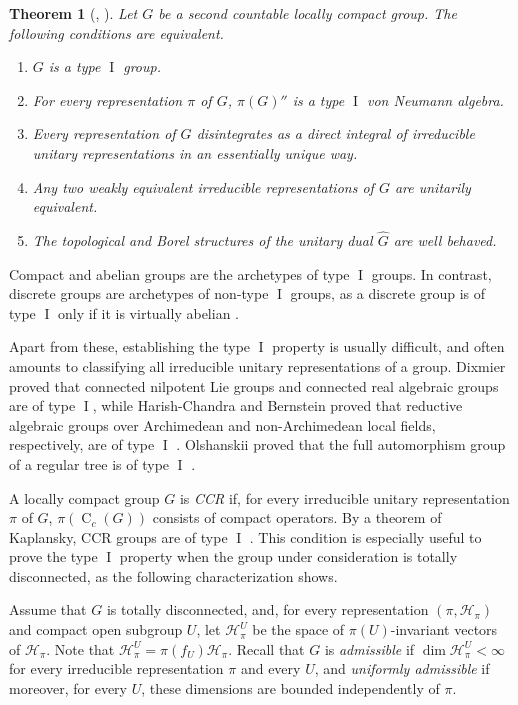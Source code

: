 \documentclass[11pt]{amsart}
\numberwithin{equation}{section}
\renewcommand{\H}{\mathcal H}
\DeclareMathOperator{\I}{I}
\newcommand{\rC}{\operatorname{C}}
\newtheorem{The}{Theorem}[section]
\theoremstyle{definition}
\begin{document}
\begin{The}[{\cite{Gl61}, \cite[Theorem~8.F.3]{BH20}}]
    \label{thm:glimm}
    Let $G$ be a second countable locally compact group. The following conditions are equivalent.
    \begin{enumerate}[\rm (i)]
        \item $G$ is a type $\I$ group.
        \item\label{it:glimm-vna} For every representation $\pi$ of $G$, $\pi(G)''$ is a type $\I$ von Neumann algebra.
        \item\label{it:glimm-disintegration} Every representation of $G$ disintegrates as a direct integral of irreducible unitary representations in an essentially unique way.
        \item\label{it:glimm-weak} Any two weakly equivalent irreducible representations of $G$ are unitarily equivalent.
        \item\label{it:glimm-dual} The topological and Borel structures of the unitary dual $\widehat{G}$ are well behaved.
    \end{enumerate}
\end{The}

Compact and abelian groups are the archetypes of type $\I$ groups. In contrast, discrete groups are archetypes of non-type $\I$ groups, as a discrete group is of type $\I$ only if it is virtually abelian \cite{Th64}. 

Apart from these, establishing the type $\I$ property is usually difficult, and often amounts to classifying all irreducible unitary representations of a group. Dixmier proved that connected nilpotent Lie groups and connected real algebraic groups are of type $\I$, while Harish-Chandra and Bernstein proved that reductive algebraic groups over Archimedean and non-Archimedean local fields, respectively, are of type $\I$ \cite[Theorem~6.E.19]{BH20}. Olshanskii proved that the full automorphism group of a regular tree is of type $\I$ \cite{Ol75,Ol77}.


A locally compact group $G$ is \emph{\textup{CCR}} if, for every irreducible unitary representation $\pi$ of $G$, $\pi(\rC_c(G))$ consists of compact operators. By a theorem of Kaplansky, \textup{CCR} groups are of type $\I$ \cite{Ka51}. This condition is especially useful to prove the type $\I$ property when the group under consideration is totally disconnected, as the following characterization shows. 

Assume that $G$ is totally disconnected, and, for every representation $(\pi,\H_{\pi})$ and compact open subgroup $U$, let $\H_{\pi}^{U}$ be the space of $\pi(U)$-invariant vectors of $\H_\pi$. Note that $\H_{\pi}^{U}=\pi(f_U)\H_\pi$. Recall that $G$ is \emph{admissible} if $\dim\H_\pi^U<\infty$ for every irreducible representation $\pi$ and every $U$, and \emph{uniformly admissible} if moreover, for every $U$, these dimensions are bounded independently of $\pi$. 
\end{document}
